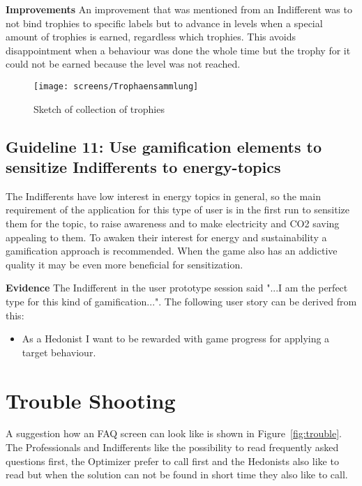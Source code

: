 \textbf{Improvements} \quad An improvement that was mentioned from an Indifferent was to not bind trophies to specific labels but to advance in levels when a special amount of trophies is earned, regardless which trophies. This avoids disappointment when a behaviour was done the whole time but the trophy for it could not be earned because the level was not reached.

\begin{figure}[h]
	\centering
	\texttt{[image: screens/Trophaensammlung]}
	\caption{Sketch of collection of trophies}
	\label{fig:trophaen} %
\end{figure}

\subsection*{Guideline 11: Use gamification elements to sensitize Indifferents to energy-topics}

The Indifferents have low interest in energy topics in general, so the main requirement of the application for this type of user is in the first run to sensitize them for the topic, to raise awareness and to make electricity and CO2 saving appealing to them. To awaken their interest for energy and sustainability a gamification approach is recommended. When the game also has an addictive quality it may be even more beneficial for sensitization.

\textbf{Evidence} \quad The Indifferent in the user prototype session said "...I am the perfect type for this kind of gamification...". The following user story can be derived from this:

\begin{itemize}
	\item As a Hedonist I want to be rewarded with game progress for applying a target behaviour.
\end{itemize} 

\section{Trouble Shooting}
A suggestion how an FAQ screen can look like is shown in Figure~\ref{fig:trouble}. The Professionals and Indifferents like the possibility to read frequently asked questions first, the Optimizer prefer to call first and the Hedonists also like to read but when the solution can not be found in short time they also like to call.

